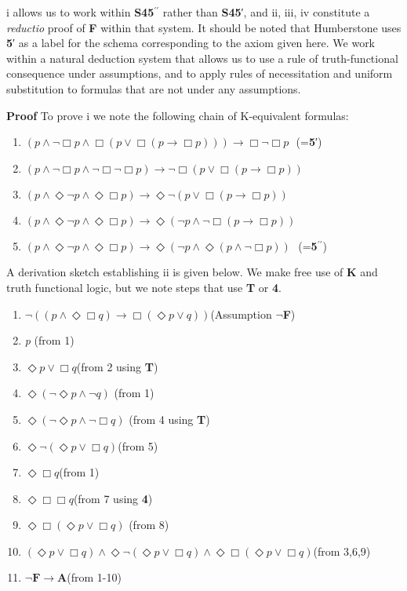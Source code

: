 \documentclass[
  11pt,
  letterpaper,
  DIV=11,
  numbers=noendperiod,
  twoside]{scrartcl}
\providecommand{\tightlist}{%
  \setlength{\itemsep}{0pt}\setlength{\parskip}{0pt}}\usepackage{longtable,booktabs,array}
\begin{document}
i allows us to work within \textbf{S45}\(^{\prime\prime}\) rather than
\textbf{S45}′, and ii, iii, iv constitute a \emph{reductio} proof of
\textbf{F} within that system. It should be noted that Humberstone uses
\textbf{5}′ as a label for the schema corresponding to the axiom given
here. We work within a natural deduction system that allows us to use a
rule of truth-functional consequence under assumptions, and to apply
rules of necessitation and uniform substitution to formulas that are not
under any assumptions.

\textbf{Proof} To prove i we note the following chain of K-equivalent
formulas:

\begin{enumerate}
\def\labelenumi{\arabic{enumi}.}
\tightlist
\item
  \((p \wedge \neg \Box p \wedge \Box (p \vee \Box (p \rightarrow \Box p))) \rightarrow \Box \neg \Box p~~~\)(=\textbf{5}′)
\item
  \((p \wedge \neg \Box p \wedge \neg \Box \neg \Box p) \rightarrow \neg \Box (p \vee \Box (p \rightarrow \Box p))\)
\item
  \((p \wedge \Diamond\neg p \wedge \Diamond\Box p) \rightarrow \Diamond\neg (p \vee \Box (p \rightarrow \Box p))\)
\item
  \((p \wedge \Diamond\neg p \wedge \Diamond\Box p) \rightarrow \Diamond(\neg p \wedge \neg \Box (p \rightarrow \Box p))\)
\item
  \((p \wedge \Diamond\neg p \wedge \Diamond\Box p) \rightarrow \Diamond(\neg p \wedge \Diamond(p \wedge \neg \Box p))~~~\)(=\textbf{5}\(^{\prime\prime}\))
\end{enumerate}

A derivation sketch establishing ii is given below. We make free use of
\textbf{K} and truth functional logic, but we note steps that use
\textbf{T} or \textbf{4}.

\begin{enumerate}
\def\labelenumi{\arabic{enumi}.}
\tightlist
\item
  \(\neg ((p\wedge \Diamond\Box q) \rightarrow \Box (\Diamond{p}\vee q))\)(Assumption
  \(\neg\)\textbf{F})
\item
  \emph{p} (from 1)
\item
  \(\Diamond{p}\vee \Box q\)(from 2 using \textbf{T})
\item
  \(\Diamond(\neg \Diamond{p}\wedge \neg q)\) (from 1)
\item
  \(\Diamond(\neg \Diamond{p}\wedge \neg \Box q)\) (from 4 using
  \textbf{T})
\item
  \(\Diamond\neg (\Diamond{p}\vee \Box q)\)(from 5)
\item
  \(\Diamond\Box q\)(from 1)
\item
  \(\Diamond\Box \Box q\)(from 7 using \textbf{4})
\item
  \(\Diamond\Box (\Diamond{p}\vee \Box q)\) (from 8)
\item
  \((\Diamond{p}\vee \Box q) \wedge \Diamond\neg (\Diamond{p}\vee \Box q)\wedge \Diamond\Box (\Diamond{p}\vee \Box q)\)(from
  3,6,9)
\item
  \(\neg \textbf{F} \rightarrow \textbf{A}\)(from 1-10)
\end{enumerate}
\end{document}
